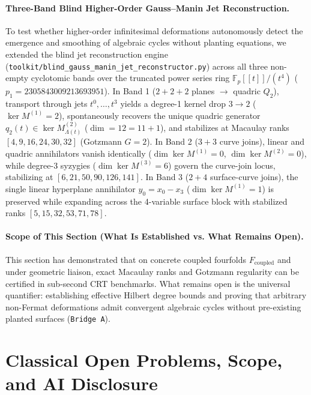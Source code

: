 \documentclass[11pt,a4paper]{article}
\theoremstyle{definition}
\theoremstyle{remark}
\begin{document}
\paragraph{Three-Band Blind Higher-Order Gauss--Manin Jet Reconstruction.}
To test whether higher-order infinitesimal deformations autonomously detect the emergence and smoothing of algebraic cycles without planting equations, we extended the blind jet reconstruction engine (\texttt{toolkit/blind\_gauss\_manin\_jet\_reconstructor.py}) across all three non-empty cyclotomic bands over the truncated power series ring $\mathbb{F}_p[[t]]/(t^4)$ ($p_1 = 2305843009213693951$). In Band 1 ($2+2+2$ planes $\to$ quadric $Q_2$), transport through jets $t^0, \dots, t^3$ yields a degree-1 kernel drop $3 \to 2$ ($\ker M^{(1)} = 2$), spontaneously recovers the unique quadric generator $q_2(t) \in \ker M^{(2)}_{\Lambda(t)}$ ($\dim = 12 = 11 + 1$), and stabilizes at Macaulay ranks $[4, 9, 16, 24, 30, 32]$ (Gotzmann $G=2$). In Band 2 ($3+3$ curve joins), linear and quadric annihilators vanish identically ($\dim \ker M^{(1)} = 0$, $\dim \ker M^{(2)} = 0$), while degree-3 syzygies ($\dim \ker M^{(3)} = 6$) govern the curve-join locus, stabilizing at $[6, 21, 50, 90, 126, 141]$. In Band 3 ($2+4$ surface-curve joins), the single linear hyperplane annihilator $y_0 = x_0 - x_3$ ($\dim \ker M^{(1)} = 1$) is preserved while expanding across the 4-variable surface block with stabilized ranks $[5, 15, 32, 53, 71, 78]$.

\paragraph{Scope of This Section (What Is Established vs. What Remains Open).}
This section has demonstrated that on concrete coupled fourfolds $F_{\mathrm{coupled}}$ and under geometric liaison, exact Macaulay ranks and Gotzmann regularity can be certified in sub-second CRT benchmarks. What remains open is the universal quantifier: establishing effective Hilbert degree bounds and proving that arbitrary non-Fermat deformations admit convergent algebraic cycles without pre-existing planted surfaces (\texttt{Bridge~A}).

\section{Classical Open Problems, Scope, and AI Disclosure}
\label{sec:open_boundary}
\end{document}
